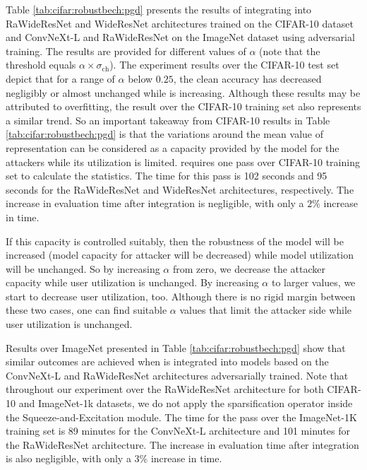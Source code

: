 \documentclass[conference]{IEEEtran}
\begin{document}
Table \ref{tab:cifar:robustbech:pgd} presents the results of integrating \sys into RaWideResNet \cite{rpapx23} and WideResNet \cite{bdmwp23} architectures trained on the CIFAR-10 dataset and ConvNeXt-L \cite{acsld23} and RaWideResNet \cite{rpapx23} on the ImageNet dataset using adversarial training. The results are provided for different values of $\alpha$ (note that the threshold equals $\alpha \times \sigma_\mathrm{ch}$). The experiment results over the CIFAR-10 test set depict that for a range of $\alpha$ below $0.25$, the clean accuracy has decreased negligibly or almost unchanged while \apgdce is increasing. Although these results may be attributed to overfitting, the result over the CIFAR-10 training set also represents a similar trend. So an important takeaway from CIFAR-10 results in Table \ref{tab:cifar:robustbech:pgd} is that the variations around the mean value of representation can be considered as a capacity provided by the model for the attackers while its utilization is limited. \sys requires one pass over CIFAR-10 training set to calculate the statistics. The time for this pass is 102 seconds and 95 seconds for the RaWideResNet and WideResNet architectures, respectively. The increase in \apgdce evaluation time after \sys integration is negligible, with only a $2\%$ increase in time.

If this capacity is controlled suitably, then the robustness of the model will be increased (model capacity for attacker will be decreased) while model utilization will be unchanged. So by increasing $\alpha$ from zero, we decrease the attacker capacity while user utilization is unchanged. By increasing $\alpha$ to larger values, we start to decrease user utilization, too. Although there is no rigid margin between these two cases, one can find suitable $\alpha$ values that limit the attacker side while user utilization is unchanged.

Results over ImageNet presented in Table \ref{tab:cifar:robustbech:pgd} show that similar outcomes are achieved when \sys is integrated into models based on the ConvNeXt-L \cite{acsld23} and RaWideResNet \cite{rpapx23} architectures adversarially trained. Note that throughout our experiment over the RaWideResNet \cite{rpapx23} architecture for both CIFAR-10 and ImageNet-1k datasets, we do not apply the sparsification operator inside the Squeeze-and-Excitation module. The time for the \sys pass over the ImageNet-1K training set is 89 minutes for the ConvNeXt-L architecture and 101 minutes for the RaWideResNet architecture. The increase in \apgdce evaluation time after \sys integration is also negligible, with only a $3\%$ increase in time.
\end{document}
